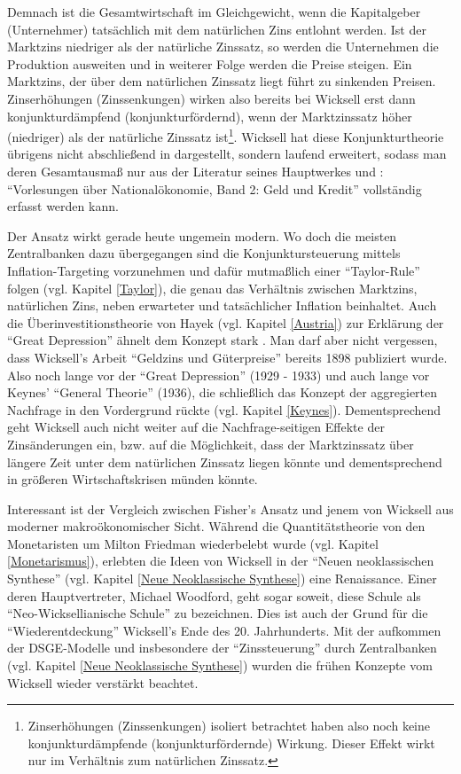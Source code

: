 Demnach ist die Gesamtwirtschaft im Gleichgewicht, wenn die Kapitalgeber (Unternehmer) tatsächlich mit dem natürlichen Zins entlohnt werden. Ist der Marktzins niedriger als der natürliche Zinssatz, so werden die Unternehmen die Produktion ausweiten und in weiterer Folge werden die Preise steigen. Ein Marktzins, der über dem natürlichen Zinssatz liegt führt zu sinkenden Preisen. Zinserhöhungen (Zinssenkungen) wirken also bereits bei Wicksell erst dann konjunkturdämpfend (konjunkturfördernd), wenn der Marktzinssatz höher (niedriger) als der natürliche Zinssatz ist\footnote{Zinserhöhungen (Zinssenkungen) isoliert betrachtet haben also noch keine konjunkturdämpfende (konjunkturfördernde) Wirkung. Dieser Effekt wirkt nur im Verhältnis zum natürlichen Zinssatz.}. Wicksell hat diese Konjunkturtheorie übrigens nicht abschließend in \textcite{Wicksel1898} dargestellt, sondern laufend erweitert, sodass man deren Gesamtausmaß nur aus der Literatur seines Hauptwerkes und \textcite{Wicksell1922}: "`Vorlesungen über Nationalökonomie, Band 2: Geld und Kredit"' vollständig erfasst werden kann. 

Der Ansatz wirkt gerade heute ungemein modern. Wo doch die meisten Zentralbanken dazu übergegangen sind die Konjunktursteuerung mittels Inflation-Targeting vorzunehmen und dafür mutmaßlich einer "`Taylor-Rule"' folgen (vgl. Kapitel \ref{Taylor}), die genau das Verhältnis zwischen Marktzins, natürlichen Zins, neben erwarteter und tatsächlicher Inflation beinhaltet. Auch die Überinvestitionstheorie von Hayek (vgl. Kapitel \ref{Austria}) zur Erklärung der "`Great Depression"' ähnelt dem Konzept stark \parencite[S. 201]{Grossekettler1989}. Man darf aber nicht vergessen, dass Wicksell's Arbeit "`Geldzins und Güterpreise"' bereits 1898 publiziert wurde. Also noch lange vor der "`Great Depression"' (1929 - 1933) und auch lange vor Keynes' "`General Theorie"' (1936), die schließlich das Konzept der aggregierten Nachfrage in den Vordergrund rückte (vgl. Kapitel \ref{Keynes}). Dementsprechend geht Wicksell auch nicht weiter auf die Nachfrage-seitigen Effekte der Zinsänderungen ein, bzw. auf die Möglichkeit, dass der Marktzinssatz über längere Zeit unter dem natürlichen Zinssatz liegen könnte und dementsprechend in größeren Wirtschaftskrisen münden könnte.

Interessant ist der Vergleich zwischen Fisher's Ansatz und jenem von Wicksell aus moderner makroökonomischer Sicht. Während die Quantitätstheorie von den Monetaristen um Milton Friedman wiederbelebt wurde (vgl. Kapitel \ref{Monetarismus}), erlebten die Ideen von Wicksell in der "`Neuen neoklassischen Synthese"' (vgl. Kapitel \ref{Neue Neoklassische Synthese}) eine Renaissance. Einer deren Hauptvertreter, Michael Woodford, geht sogar soweit, diese Schule als "`Neo-Wicksellianische Schule"' zu bezeichnen. Dies ist auch der Grund für die "`Wiederentdeckung"' Wicksell's Ende des 20. Jahrhunderts. Mit der aufkommen der DSGE-Modelle und insbesondere der "`Zinssteuerung"' durch Zentralbanken (vgl. Kapitel \ref{Neue Neoklassische Synthese}) wurden die frühen Konzepte vom Wicksell wieder verstärkt beachtet.

